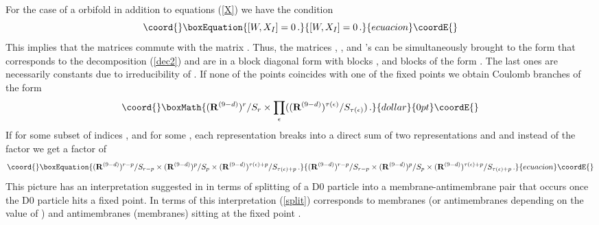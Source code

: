 \documentclass[a4paper,a4paper]{article}
\begin{document}
{For the case of a \coordHE{} orbifold in addition to equations (\ref{X}) we have the condition 
\begin{equation}\coord{}\boxEquation{
[W, X_{I}] = 0 \, .
}{
[W, X_{I}] = 0 \, .
}{ecuacion}\coordE{}\end{equation}
This implies that the matrices \coordHE{} commute with the matrix \coordHE{}. Thus, the matrices  \coordHE{}, \coordHE{}, and \coordHE{}'s can be 
simultaneously brought to the form that corresponds to the decomposition (\ref{dec2}) and \coordHE{} are in a block diagonal 
form with \coordHE{} blocks \coordHE{}, \coordHE{} and 
blocks of the form \coordHE{}. The last ones are necessarily constants due to 
irreducibility of \coordHE{}. If none of the points \coordHE{} coincides with one of the fixed points \myHighlight{$\Lambda_{\epsilon}$}\coordHE{} 
we obtain  Coulomb branches of the form 
$$\coord{}\boxMath{
({\bf R}^{(9-d)})^{r}/S_{r}\times 
\prod_{\epsilon}(({\bf R}^{(9-d)})^{\tau(\epsilon )}/S_{\tau(\epsilon )} )\, .
}{dollar}{0pt}\coordE{}$$ If \coordHE{} for some 
subset of indices \coordHE{}, \coordHE{}  
and for some  \myHighlight{$\epsilon$}\coordHE{}, each representation \coordHE{} breaks into a direct sum of two representations \coordHE{} 
and \coordHE{} and instead of the factor 
\coordHE{}
we get a factor of 
\begin{equation}\coord{}\boxEquation{ \label{split}
({\bf R}^{(9-d)})^{r-p}/S_{r-p}\times ({\bf R}^{(9-d)})^{p}/S_{p}\times ({\bf R}^{(9-d)})^{\tau(\epsilon )+ p}/S_{\tau(\epsilon )+p}  \, .
}{ ({\bf R}^{(9-d)})^{r-p}/S_{r-p}\times ({\bf R}^{(9-d)})^{p}/S_{p}\times ({\bf R}^{(9-d)})^{\tau(\epsilon )+ p}/S_{\tau(\epsilon )+p}  \, .
}{ecuacion}\coordE{}\end{equation} 
This picture has an interpretation suggested in \cite{RamgWald} 
in terms of splitting of a D0 particle into a membrane-antimembrane pair that occurs once the D0 particle hits a  fixed point. 
In terms of this interpretation (\ref{split}) corresponds to \coordHE{} membranes (or antimembranes depending on the value of \myHighlight{$\eta_{\epsilon}$}\coordHE{}) 
and \coordHE{} antimembranes (membranes) sitting at the fixed point \myHighlight{$\Lambda_{\epsilon}$}\coordHE{}. 
  

}
\end{document}
